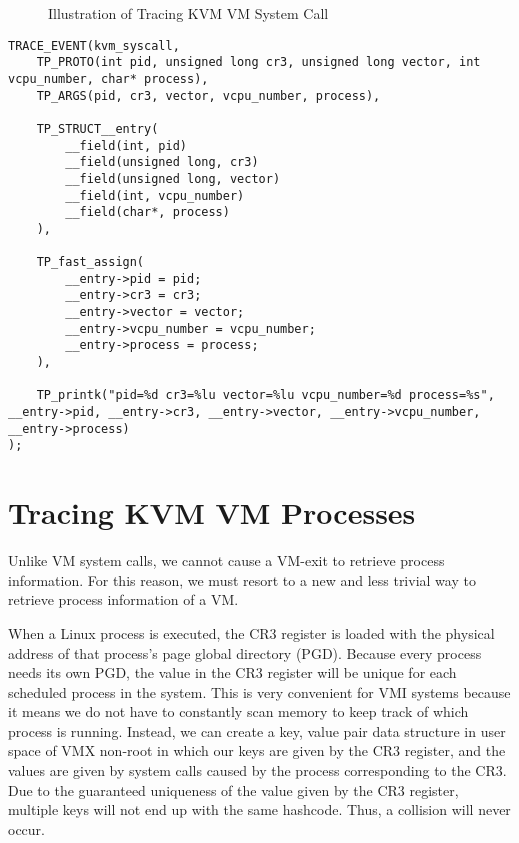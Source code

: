 \documentclass{report}
\begin{document}
\begin{spacing}{1.5}
\begin{figure}[ht]
\centering
  \caption{Illustration of Tracing KVM VM System Call}
\end{figure}


\leavevmode\newline


\begin{lstlisting}[caption={Implementation of KVM SYSCALL Linux Kernel Custom Tracepoint},captionpos=b]
TRACE_EVENT(kvm_syscall,
    TP_PROTO(int pid, unsigned long cr3, unsigned long vector, int vcpu_number, char* process),
    TP_ARGS(pid, cr3, vector, vcpu_number, process),

    TP_STRUCT__entry(
        __field(int, pid)
        __field(unsigned long, cr3)
        __field(unsigned long, vector)
        __field(int, vcpu_number)
        __field(char*, process)
    ),

    TP_fast_assign(
        __entry->pid = pid;
        __entry->cr3 = cr3;
        __entry->vector = vector;
        __entry->vcpu_number = vcpu_number;
        __entry->process = process;
    ),

    TP_printk("pid=%d cr3=%lu vector=%lu vcpu_number=%d process=%s", __entry->pid, __entry->cr3, __entry->vector, __entry->vcpu_number, __entry->process)
);
\end{lstlisting}







\section{Tracing KVM VM Processes}

{\large
Unlike VM system calls, we cannot cause a VM-exit to retrieve process information. For this reason, we must resort to a new and less trivial way to retrieve process information of a VM.
\newline
}

{\large
\noindent When a Linux process is executed, the CR3 register is loaded with the physical address of that process's page global directory (PGD). Because every process needs its own PGD, the value in the CR3 register will be unique for each scheduled process in the system. This is very convenient for VMI systems because it means we do not have to constantly scan memory to keep track of which process is running. Instead, we can create a key, value pair data structure in user space of VMX non-root in which our keys are given by the CR3 register, and the values are given by system calls caused by the process corresponding to the CR3. Due to the guaranteed uniqueness of the value given by the CR3 register, multiple keys will not end up with the same hashcode. Thus, a collision will never occur.
\newline
}


\end{spacing}
\end{document}
